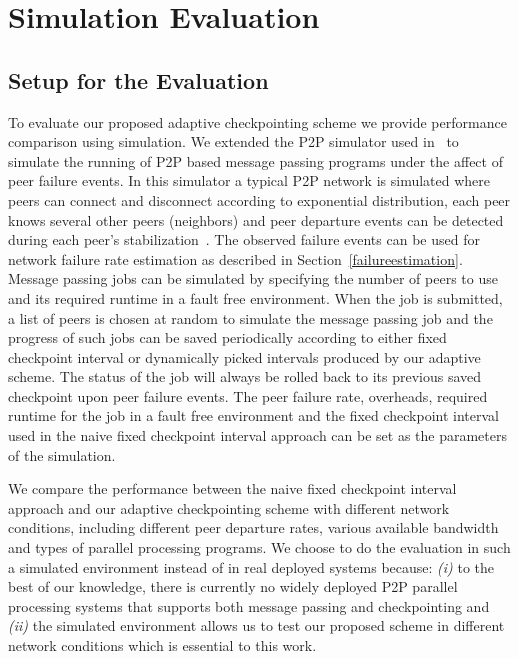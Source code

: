 \documentclass[times, 12pt, onecolumn]{article}
\newcommand{\refsec}[1]{Section~\ref{#1}}
\begin{document}
\section{Simulation Evaluation}
\subsection{Setup for the Evaluation}


To evaluate our proposed adaptive checkpointing scheme we provide performance comparison using simulation. 
We extended the P2P simulator used in~\cite{estimation} to simulate the running of P2P based message passing 
programs under the affect of peer failure events. In this simulator a typical P2P network is simulated where 
peers can connect and disconnect according to exponential distribution, each peer knows several other peers 
(neighbors) and peer departure events can be detected during each peer's stabilization~\cite{chord, mspastry}. 
The observed failure events can be used for network failure rate estimation as described in \refsec{failureestimation}. 
Message passing jobs can be simulated by specifying the number of peers to use and its required runtime in a 
fault free environment. When the job is submitted, a list of peers is chosen at random to simulate the 
message passing job and the progress of such jobs can be saved periodically according to either fixed checkpoint 
interval or dynamically picked intervals produced by our adaptive scheme. The status of the job will always be 
rolled back to its previous saved checkpoint upon peer failure events. The peer failure rate, overheads, required 
runtime for the job in a fault free environment and the fixed checkpoint interval used in the naive fixed 
checkpoint interval approach can be set as the parameters of the simulation. 

We compare the performance between the naive fixed checkpoint interval approach
and our adaptive checkpointing scheme with different network conditions,
including different peer departure rates, various available bandwidth and types
of parallel processing programs. We choose to do the evaluation in such a
simulated environment instead of in real deployed systems because: \emph{(i)}
to the best of our knowledge, there is currently no widely deployed P2P
parallel processing systems that supports both message passing and
checkpointing and \emph{(ii)} the simulated environment allows us to test our
proposed scheme in different network conditions which is essential to this
work. 
\end{document}
